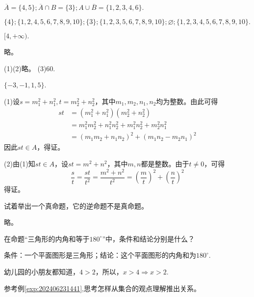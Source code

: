 \documentclass[lang=cn,newtx,10pt,scheme=chinese]{elegantbook}
\begin{document}
\begin{exercise}
  $\overline{A}=\{4,5\};\overline{A}\cap B=\{3\};A\cup\overline{B}=\{1,2,3,4,6\}.$
\end{exercise}
\begin{exercise}
  $\{4\};\{1,2,4,5,6,7,8,9,10\};\{3\};\{1,2,3,5,6,7,8,9,10\};\varnothing ;\{1,2,3,4,5,6,7,8,9,10\}.$
\end{exercise}
\begin{exercise}
  $[4,+\infty).$
\end{exercise}
\begin{exercise}
  略。
\end{exercise}
\begin{exercise}
  (1)(2)略。
  (3)60.
\end{exercise}
\begin{exercise}
  $\{-3,-1,1,5\}$.
\end{exercise}
\begin{exercise}
  (1)设$s=m_1^2+n_1^2,t=m_2^2+n_2^2$，其中$m_1,m_2,n_1,n_2$均为整数。由此可得
  $$\begin{aligned}
    st& =(m_1^2+n_1^2)(m_2^2+n_2^2)  \\
    &=m_1^2m_2^2+n_1^2n_2^2+m_1^2n_2^2+m_2^2n_1^2 \\
    &=(m_1m_2+n_1n_2)^2+(m_1n_2-m_2n_1)^2
    \end{aligned}$$
  因此$st\in A$，得证。
  
  (2)由(1)知$st \in A$，设$st=m^2+n^2$，其中$m,n$都是整数。由于$t\neq 0$，可得$$\frac st=\frac{st}{t^2}=\frac{m^2+n^2}{t^2}=\left(\frac mt\right)^2+\left(\frac nt\right)^2$$
  得证。
\end{exercise}
\begin{exercise}\label{exer:202405021028}
  试着举出一个真命题，它的逆命题不是真命题。
\end{exercise}
\begin{solution}
  略。
\end{solution}
\begin{exercise}
  在命题“三角形的内角和等于$180^{\circ}$”中，条件和结论分别是什么？
\end{exercise}
\begin{solution}
  条件：一个平面图形是三角形；结论：这个平面图形的内角和为$180^{\circ}$.
\end{solution}
\begin{example}\label{exp:202406231441}
  幼儿园的小朋友都知道，$4>2$，所以，$x>4\Rightarrow x>2$.
\end{example}
\begin{exercise}\label{202406262000}
  参考例\ref{exp:202406231441},思考怎样从集合的观点理解推出关系。
\end{exercise}
\end{document}
